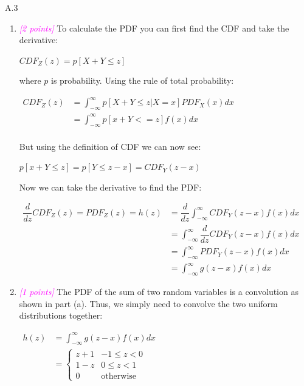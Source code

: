 \documentclass{article}
\newcommand{\1}{\mathbf{1}}
\newcommand{\points}[1]{\small\textcolor{magenta}{\emph{[#1 points]}} \normalsize}
\begin{document}
A.3 
\begin{enumerate}
	\item \points{2} To calculate the PDF you can first find the CDF and take the derivative:
	\begin{center}
		$CDF_Z(z)=p[X+Y\leq z]$
	\end{center}
	where $p$ is probability. Using the rule of total probability:
	\begin{center}
		$\begin{aligned}
		CDF_Z(z)&=\int_{-\infty}^{\infty}p[X+Y\leq z|X=x]PDF_X(x)dx\\
		&=\int_{-\infty}^{\infty}p[x+Y<=z]f(x)dx\\
		\end{aligned}$
	\end{center}
	But using the definition of CDF we can now see:
	\begin{center}
		$p[x+Y\leq z]=p[Y\leq z-x]=CDF_Y(z-x)$
	\end{center}
	Now we can take the derivative to find the PDF:
	\begin{center}
		$\begin{aligned}
		\dfrac{d}{dz}CDF_Z(z)=PDF_Z(z)=h(z)&=\dfrac{d}{dz}\int_{-\infty}^{\infty}CDF_Y(z-x)f(x)dx\\
		&=\int_{-\infty}^{\infty}\dfrac{d}{dz}CDF_Y(z-x)f(x)dx\\
		&=\int_{-\infty}^{\infty}PDF_Y(z-x)f(x)dx\\
		&=\int_{-\infty}^{\infty}g(z-x)f(x)dx
		\end{aligned}$
	\end{center}
	
	\item \points{1} The PDF of the sum of two random variables is a convolution as shown in part (a). Thus, we simply need to convolve the two uniform distributions together:
	\begin{center}
		$\begin{aligned}
		h(z)&=\int_{-\infty}^{\infty}g(z-x)f(x)dx\\
		&=\begin{cases}
		z+1 & -1\leq z<0\\
		1-z & 0\leq z<1\\
		0 & \text{otherwise}
		\end{cases}\\
		\end{aligned}$
	\end{center}
\end{enumerate}
\end{document}
